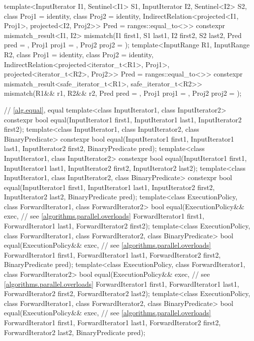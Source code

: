 \begin{codeblock}
{{    template<InputIterator I1, Sentinel<I1> S1, InputIterator I2, Sentinel<I2> S2,
             class Proj1 = identity, class Proj2 = identity,
             IndirectRelation<projected<I1, Proj1>,
                              projected<I2, Proj2>> Pred = ranges::equal_to<>>
      constexpr mismatch_result<I1, I2>
        mismatch(I1 first1, S1 last1, I2 first2, S2 last2, Pred pred = {},
                 Proj1 proj1 = {}, Proj2 proj2 = {});
    template<InputRange R1, InputRange R2,
             class Proj1 = identity, class Proj2 = identity,
             IndirectRelation<projected<iterator_t<R1>, Proj1>,
                              projected<iterator_t<R2>, Proj2>> Pred = ranges::equal_to<>>
      constexpr mismatch_result<safe_iterator_t<R1>, safe_iterator_t<R2>>
        mismatch(R1&& r1, R2&& r2, Pred pred = {},
                 Proj1 proj1 = {}, Proj2 proj2 = {});
  }

  // \ref{alg.equal}, equal
  template<class InputIterator1, class InputIterator2>
    constexpr bool equal(InputIterator1 first1, InputIterator1 last1,
                         InputIterator2 first2);
  template<class InputIterator1, class InputIterator2, class BinaryPredicate>
    constexpr bool equal(InputIterator1 first1, InputIterator1 last1,
                         InputIterator2 first2, BinaryPredicate pred);
  template<class InputIterator1, class InputIterator2>
    constexpr bool equal(InputIterator1 first1, InputIterator1 last1,
                         InputIterator2 first2, InputIterator2 last2);
  template<class InputIterator1, class InputIterator2, class BinaryPredicate>
    constexpr bool equal(InputIterator1 first1, InputIterator1 last1,
                         InputIterator2 first2, InputIterator2 last2,
                         BinaryPredicate pred);
  template<class ExecutionPolicy, class ForwardIterator1, class ForwardIterator2>
    bool equal(ExecutionPolicy&& exec, // see \ref{algorithms.parallel.overloads}
               ForwardIterator1 first1, ForwardIterator1 last1,
               ForwardIterator2 first2);
  template<class ExecutionPolicy, class ForwardIterator1, class ForwardIterator2,
           class BinaryPredicate>
    bool equal(ExecutionPolicy&& exec, // see \ref{algorithms.parallel.overloads}
               ForwardIterator1 first1, ForwardIterator1 last1,
               ForwardIterator2 first2, BinaryPredicate pred);
  template<class ExecutionPolicy, class ForwardIterator1, class ForwardIterator2>
    bool equal(ExecutionPolicy&& exec, // see \ref{algorithms.parallel.overloads}
               ForwardIterator1 first1, ForwardIterator1 last1,
               ForwardIterator2 first2, ForwardIterator2 last2);
  template<class ExecutionPolicy, class ForwardIterator1, class ForwardIterator2,
           class BinaryPredicate>
    bool equal(ExecutionPolicy&& exec, // see \ref{algorithms.parallel.overloads}
               ForwardIterator1 first1, ForwardIterator1 last1,
               ForwardIterator2 first2, ForwardIterator2 last2,
               BinaryPredicate pred);

}
\end{codeblock}
